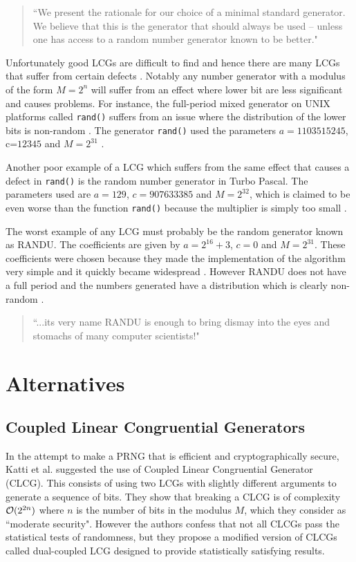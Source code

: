 \begin{quotation}
``We present the rationale for our choice of a minimal standard generator. We believe that this is the generator that should always be used -- unless one has access to a random number generator known to be better." \citep{park_miller}
\end{quotation}

Unfortunately good LCGs are difficult to find and hence there are many LCGs that suffer from certain defects \citep{park_miller}. Notably any number generator with a modulus of the form $M=2^n$ will suffer from an effect where lower bit are less significant and causes problems. For instance, the full-period mixed generator on UNIX platforms called \texttt{rand()} suffers from an issue where  the distribution of the lower bits is non-random \citep{park_miller}. The generator \texttt{rand()} used the parameters $a=1103515245$, c=$12345$ and $M=2^{31}$ \citep{park_miller}.

Another poor example of a LCG which suffers from the same effect that causes a defect in \texttt{rand()} is the random number generator in Turbo Pascal. The parameters used are $a=129$, $c=907633385$ and $M=2^{32}$, which is claimed to be even worse than the function \texttt{rand()} because the multiplier is simply too small \citep{park_miller}.

The worst example of any LCG must probably be the random generator known as RANDU. The coefficients are given by $a=2^{16}+ 3$, $c=0$ and $M=2^{31}$. These coefficients were chosen because they made the implementation of the algorithm very simple and it quickly became widespread \citep{park_miller}. However RANDU does not have a full period and the numbers generated have a distribution which is clearly non-random \citep{park_miller}.

\begin{quotation}
``...its very name RANDU is enough to bring dismay into the eyes and stomachs of many computer scientists!" \citep{Knuth_art2}
\end{quotation}

\section{Alternatives}
\subsection{Coupled Linear Congruential Generators}
In the attempt to make a PRNG that is efficient and cryptographically secure, Katti et al. suggested the use of Coupled Linear Congruential Generator (CLCG). This consists of using two LCGs with slightly different arguments to generate a sequence of bits. They show that breaking a CLCG is of complexity $\mathcal{O} (2^{2n})$ where $n$ is the number of bits in the modulus $M$, which they consider as ``moderate security". However the authors confess that not all CLCGs pass the statistical tests of randomness, but they propose a modified version of CLCGs called dual-coupled LCG designed to provide statistically satisfying results. \citep{katti_coupledCG2}

